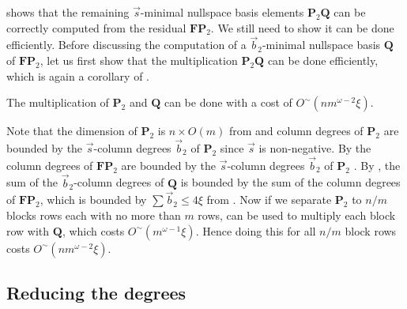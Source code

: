  shows that
the remaining $\vec{s}$-minimal nullspace basis elements $\mathbf{P}_{2}\mathbf{Q}$
can be correctly computed from the residual $\mathbf{F}\mathbf{P}_{2}$.
We still need to show it can be done efficiently. Before discussing
the computation of a $\vec{b}_{2}$-minimal nullspace basis $\mathbf{Q}$
of $\mathbf{F}\mathbf{P}_{2}$, let us first show that the multiplication
$\mathbf{P}_{2}\mathbf{Q}$ can be done efficiently, which is again
a corollary of .
\begin{lem}
\label{lem:multiplyingP2Q}The multiplication of $\mathbf{P}_{2}$
and $\mathbf{Q}$ can be done with a cost of $O^{\sim}\left(nm^{\omega-2}\xi\right)$.\end{lem}
\begin{pf}
Note that the dimension of $\mathbf{P}_{2}$ is $n\times O(m)$ from
and column
degrees of $\mathbf{P}_{2}$ are bounded by the $\vec{s}$-column
degrees $\vec{b}_{2}$ of $\mathbf{P}_{2}$ since $\vec{s}$ is non-negative.
By  the column degrees of $\mathbf{F}\mathbf{P}_{2}$
are bounded by the $\vec{s}$-column degrees $\vec{b}_{2}$ of $\mathbf{P}_{2}$
. By ,
the sum of the $\vec{b}_{2}$-column degrees of $\mathbf{Q}$ is bounded
by the sum of the column degrees of $\mathbf{F}\mathbf{P}_{2}$, which
is bounded by $\sum\vec{b}_{2}\le4\xi$ from .
Now if we separate $\mathbf{P}_{2}$ to $n/m$ blocks rows each with
no more than $m$ rows, 
can be used to multiply each block row with $\mathbf{Q}$, which costs
$O^{\sim}(m^{\omega-1}\xi)$. Hence doing this for all $n/m$ block
rows costs $O^{\sim}\left(nm^{\omega-2}\xi\right)$.
\end{pf}

\subsection{Reducing the degrees}

